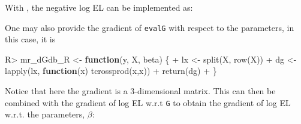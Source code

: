 \documentclass[article]{jss}
\newenvironment{Shaded}{\begin{snugshade}}{\end{snugshade}}
\newcommand{\ControlFlowTok}[1]{\textcolor[rgb]{0.13,0.29,0.53}{\textbf{#1}}}
\newcommand{\FunctionTok}[1]{\textcolor[rgb]{0.00,0.00,0.00}{#1}}
\newcommand{\NormalTok}[1]{#1}
\newcommand{\OtherTok}[1]{\textcolor[rgb]{0.56,0.35,0.01}{#1}}
\newcommand{\SpecialCharTok}[1]{\textcolor[rgb]{0.00,0.00,0.00}{#1}}
\renewcommand{\|}{\,|\,}
\begin{document}
With , the negative log EL can be implemented as:

\begin{Shaded}
\end{Shaded}

One may also provide the gradient of \texttt{evalG} with respect to the parameters, in this case, it is

\begin{Shaded}
\begin{Highlighting}[]
\NormalTok{R}\SpecialCharTok{\textgreater{}}\NormalTok{ mr\_dGdb\_R }\OtherTok{\textless{}{-}} \ControlFlowTok{function}\NormalTok{(y, X, beta) \{}
\SpecialCharTok{+}\NormalTok{    lx }\OtherTok{\textless{}{-}} \FunctionTok{split}\NormalTok{(X, }\FunctionTok{row}\NormalTok{(X))}
\SpecialCharTok{+}\NormalTok{    dg }\OtherTok{\textless{}{-}} \FunctionTok{lapply}\NormalTok{(lx, }\ControlFlowTok{function}\NormalTok{(x) }\FunctionTok{tcrossprod}\NormalTok{(x,x))}
\SpecialCharTok{+}    \FunctionTok{return}\NormalTok{(dg)}
\SpecialCharTok{+}\NormalTok{  \}}
\end{Highlighting}
\end{Shaded}

Notice that here the gradient is a 3-dimensional matrix. This can then be combined with the gradient of log EL w.r.t \texttt{G} to obtain the gradient of log EL w.r.t. the parameters, \(\beta\):
\end{document}
